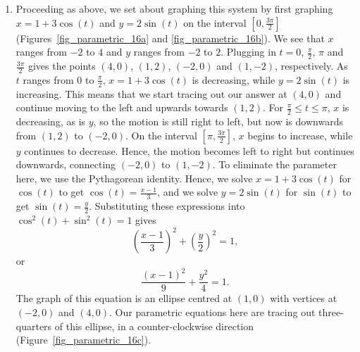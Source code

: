 \begin{example}
\begin{enumerate}
\item  Proceeding as above, we set about graphing this system by first graphing $x = 1 + 3\cos(t)$ and $y = 2\sin(t)$ on the interval $\left[0, \frac{3\pi}{2}\right]$ (Figures~\ref{fig_parametric_16a} and \ref{fig_parametric_16b}).  We see that $x$ ranges from $-2$ to $4$ and $y$ ranges from $-2$ to $2$.  Plugging in $t = 0$, $\frac{\pi}{2}$, $\pi$ and $\frac{3\pi}{2}$ gives the points $(4,0)$, $(1,2)$, $(-2,0)$ and $(1,-2)$, respectively.  As $t$ ranges from $0$ to $\frac{\pi}{2}$, $x = 1 + 3\cos(t)$ is decreasing, while $y = 2\sin(t)$ is increasing.  This means that we start tracing out our answer at $(4,0)$ and continue moving to the left and upwards towards $(1,2)$.  For $\frac{\pi}{2} \leq t \leq \pi$, $x$ is decreasing, as is $y$, so the motion is still right to left, but now is downwards from $(1,2)$ to $(-2,0)$.  On the interval $\left[\pi, \frac{3\pi}{2}\right]$, $x$ begins to increase, while $y$ continues to decrease.  Hence, the motion becomes left to right but continues downwards, connecting $(-2,0)$ to $(1,-2)$.  To eliminate the parameter here, we  use the Pythagorean identity.  Hence, we solve $x = 1+3\cos(t)$ for $\cos(t)$ to get $\cos(t) = \frac{x-1}{3}$, and we solve $y = 2\sin(t)$ for $\sin(t)$ to get $\sin(t) = \frac{y}{2}$.  Substituting these expressions into $\cos^{2}(t) + \sin^{2}(t) = 1$ gives $$\left(\frac{x-1}{3}\right)^2 + \left(\frac{y}{2}\right)^2 = 1,$$
or 
$$\frac{(x-1)^2}{9} + \frac{y^2}{4} = 1.$$
The graph of this equation is an ellipse centred at $(1,0)$ with vertices at $(-2,0)$ and $(4,0)$.  Our parametric equations here are tracing out three-quarters of this ellipse, in a  counter-clockwise direction (Figure~\ref{fig_parametric_16c}).


\end{enumerate}
\end{example}
